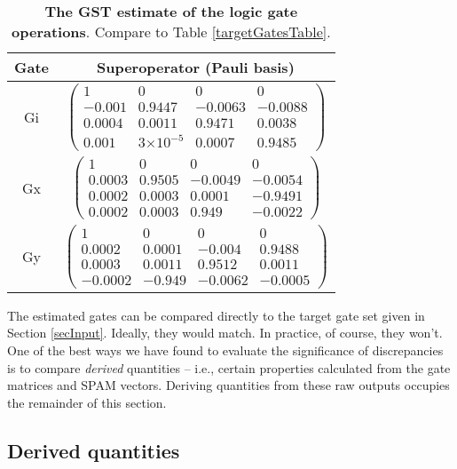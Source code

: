 \documentclass{article}[11pt]
\providecommand{\e}[1]{\ensuremath{\times 10^{#1}}}
\begin{document}
\begin{table}[h]
\begin{center}
\begin{tabular}[l]{|c|c|}
\hline
Gate & Superoperator (Pauli basis) \\ \hline
Gi & $ \left(\!\!\begin{array}{cccc}
1 & 0 & 0 & 0 \\ 
-0.001 & 0.9447 & -0.0063 & -0.0088 \\ 
0.0004 & 0.0011 & 0.9471 & 0.0038 \\ 
0.001 & 3\e{-5} & 0.0007 & 0.9485
 \end{array}\!\!\right) $
 \\ \hline
Gx & $ \left(\!\!\begin{array}{cccc}
1 & 0 & 0 & 0 \\ 
0.0003 & 0.9505 & -0.0049 & -0.0054 \\ 
0.0002 & 0.0003 & 0.0001 & -0.9491 \\ 
0.0002 & 0.0003 & 0.949 & -0.0022
 \end{array}\!\!\right) $
 \\ \hline
Gy & $ \left(\!\!\begin{array}{cccc}
1 & 0 & 0 & 0 \\ 
0.0002 & 0.0001 & -0.004 & 0.9488 \\ 
0.0003 & 0.0011 & 0.9512 & 0.0011 \\ 
-0.0002 & -0.949 & -0.0062 & -0.0005
 \end{array}\!\!\right) $
 \\ \hline
\end{tabular}

\caption{\textbf{The GST estimate of the logic gate operations}.  Compare to Table \ref{targetGatesTable}.\label{bestGatesetGatesTable}}
\end{center}
\end{table}

The estimated gates can be compared directly to the target gate set given in Section \ref{secInput}.  Ideally, they would match.  In practice, of course, they won't.  One of the best ways we have found to evaluate the significance of discrepancies is to compare \emph{derived} quantities -- i.e., certain properties calculated from the gate matrices and SPAM vectors.  Deriving quantities from these raw outputs occupies the remainder of this section.
\clearpage

\subsection{Derived quantities\label{derivedQtySection}}
\end{document}
